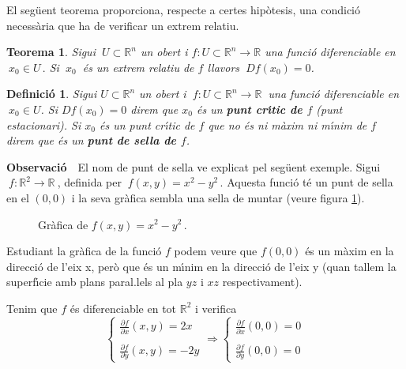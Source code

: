 \documentclass[12pt]{article}
\newcommand{\observacio}{\textbf{Observaci{\'o}}\ \ }
\newtheorem{definicio}{Definici{\'o}}[subsection]
\newtheorem{teorema}{Teorema}[subsection]
\newcommand{\R}{\mathbb{R}}
\begin{document}
\vspace{0.4cm}
El seg{\"u}ent teorema proporciona, respecte a certes hip{\`o}tesis, una condici{\'o} necess{\`a}ria que ha de verificar un extrem relatiu.

\vspace{0.4cm}
\begin{teorema}\label{teorema punt critic}
Sigui $\ U \subset \R ^ n $ un obert i $ f:U \subset
\R ^ n \longrightarrow \R $ una funci{\'o} diferenciable en $\ x_0\in U\,.$ Si
$ \ x_0\ $ {\'e}s un extrem relatiu  de $ f $ llavors $\ Df (x_0) = 0 $.
\end{teorema}


\vspace{0.4cm}
\begin{definicio}
Sigui $ U \subset \R ^ n $ un obert i $\ f:U \subset
\R ^ n \longrightarrow \R\ $ una funci{\'o} diferenciable en $\ x_0 \in U $. Si
 $ Df (x_0) = 0 $ direm que $ x_0 $ {\'e}s un \textbf{punt cr{\'\i}tic de
 $ f $} (punt estacionari). Si $ x_0 $ {\'e}s un punt cr{\'\i}tic de $ f $ que no {\'e}s ni m{\`a}xim ni
 m{\'\i}nim de $ f $ direm que {\'e}s un \textbf{punt de sella de $ f $}.
\end{definicio}

\vspace{0.4cm}
\observacio El nom de punt de sella ve explicat pel seg{\"u}ent exemple. Sigui
$\ f:\R^2 \longrightarrow \R\ $, definida per $\ f(x,y)=x^2-y^2\,.$ Aquesta funci{\'o} t{\'e} un punt de sella en el $(0,0)$ i la seva gr{\`a}fica sembla una sella de muntar (veure figura \ref{sell}).

\begin{figure} [h!]
\begin{center}
\end{center}\caption{Gr{\`a}fica de $f(x,y)=x^2-y^2\,.$}\label{sell}
\end{figure}

\vspace{0.3cm}
Estudiant la gr{\`a}fica de la funci{\'o} $ f $ podem veure que $ f (0,0) $ {\'e}s un
m{\`a}xim en la direcci{\'o} de l'eix x, per{\`o} que {\'e}s un m{\'\i}nim en la
direcci{\'o} de l'eix y (quan tallem la superf{\'\i}cie amb plans
paral.lels al pla $ yz $ i $ xz $ respectivament).

\vspace{0.2cm}
Tenim que $f$ {\'e}s diferenciable en tot $\R^2$ i verifica
\[
\begin{cases}
\frac{\partial f}{\partial x}(x,y) = 2x \\
\\
 \frac{\partial f}{\partial y}(x,y) = -2y
\end{cases} \Longrightarrow \begin{cases}
\frac{\partial f}{\partial x}(0,0) = 0 \\
\\
 \frac{\partial f}{\partial y}(0,0) = 0
\end{cases}
\]
\end{document}
